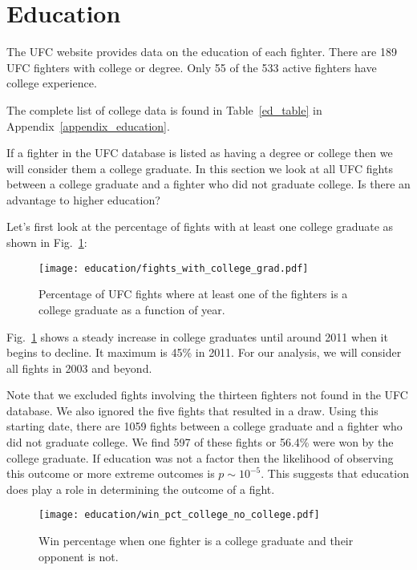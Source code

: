 \clearpage
\section*{Education}

The UFC website provides data on the education of each fighter.
There are 189 UFC fighters with college or degree. Only 55
of the 533 active fighters have college experience.

The complete list of college data is found in Table~\ref{ed_table}
in Appendix~\ref{appendix_education}.

If a fighter in the UFC database is listed as having a degree
or college then we will consider them a college graduate. In
this section we look at all UFC fights between a college graduate
and a fighter who did not graduate college. Is there an advantage
to higher education?

Let's first look at the percentage of fights with at least
one college graduate as shown in Fig.~\ref{fights_with_college_grad}:

\begin{figure}[h]
\begin{center}
\texttt{[image: education/fights\_with\_college\_grad.pdf]}
\caption{Percentage of UFC fights where at least one of the fighters
is a college graduate as a function of year.}
\label{fights_with_college_grad}
\end{center}
\end{figure}

Fig.~\ref{fights_with_college_grad} shows a steady increase in
college graduates until around 2011 when it begins to decline.
It maximum is 45\% in 2011. For our analysis, we will consider
all fights in 2003 and beyond.

Note that we excluded fights involving the thirteen fighters
not found in the UFC database. We also ignored the five fights that resulted
in a draw.
Using this starting date, there are 1059 fights between a college
graduate and a fighter who did not graduate college. We find
597 of these fights or 56.4\% were won by the college graduate.
If education was not a factor then the likelihood of observing
this outcome or more extreme outcomes is $p\sim10^{-5}$. This
suggests that education does play a role in determining the outcome
of a fight.

\begin{figure}[h]
\begin{center}
\texttt{[image: education/win\_pct\_college\_no\_college.pdf]}
\caption{Win percentage when one fighter is a college graduate and their
opponent is not.}
\label{win_pct_college_no_college}
\end{center}
\end{figure}
